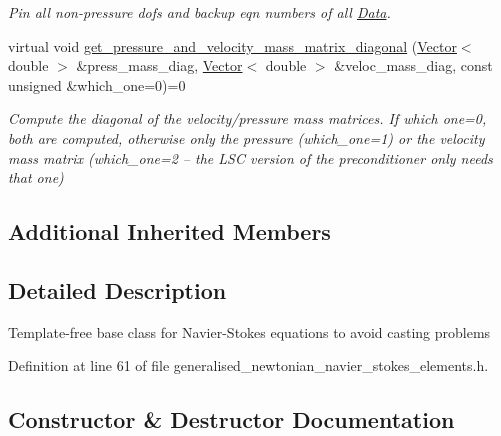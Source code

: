 \begin{DoxyCompactItemize}
\begin{DoxyCompactList}\small\item\em Pin all non-\/pressure dofs and backup eqn numbers of all \hyperlink{classoomph_1_1Data}{Data}. \end{DoxyCompactList}\item 
virtual void \hyperlink{classoomph_1_1GeneralisedNewtonianTemplateFreeNavierStokesEquationsBase_a04ab7221559a058af6f0266197094320}{get\+\_\+pressure\+\_\+and\+\_\+velocity\+\_\+mass\+\_\+matrix\+\_\+diagonal} (\hyperlink{classoomph_1_1Vector}{Vector}$<$ double $>$ \&press\+\_\+mass\+\_\+diag, \hyperlink{classoomph_1_1Vector}{Vector}$<$ double $>$ \&veloc\+\_\+mass\+\_\+diag, const unsigned \&which\+\_\+one=0)=0
\begin{DoxyCompactList}\small\item\em Compute the diagonal of the velocity/pressure mass matrices. If which one=0, both are computed, otherwise only the pressure (which\+\_\+one=1) or the velocity mass matrix (which\+\_\+one=2 -- the L\+SC version of the preconditioner only needs that one) \end{DoxyCompactList}\end{DoxyCompactItemize}
\subsection*{Additional Inherited Members}


\subsection{Detailed Description}
Template-\/free base class for Navier-\/\+Stokes equations to avoid casting problems 

Definition at line 61 of file generalised\+\_\+newtonian\+\_\+navier\+\_\+stokes\+\_\+elements.\+h.



\subsection{Constructor \& Destructor Documentation}
\mbox{\label{classoomph_1_1GeneralisedNewtonianTemplateFreeNavierStokesEquationsBase_aa84e6885d642fe71f5b31391001612a0}} 
